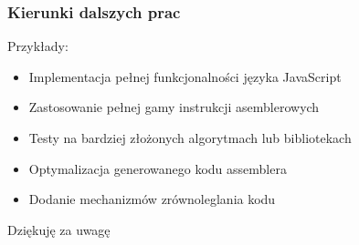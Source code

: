 \begin{frame}
  \frametitle{Kierunki dalszych prac}
  \begin{block}{Przykłady:}
    \begin{itemize}
      \item  Implementacja pełnej funkcjonalności języka JavaScript
      \item  Zastosowanie pełnej gamy instrukcji asemblerowych
      \item  Testy na bardziej złożonych algorytmach lub bibliotekach
      \item  Optymalizacja generowanego kodu assemblera
      \item  Dodanie mechanizmów zrównoleglania kodu
    \end{itemize}
  \end{block}
\end{frame}

\begin{frame}
	\begin{center}
	\Huge Dziękuję za uwagę
	\end{center}
\end{frame}
